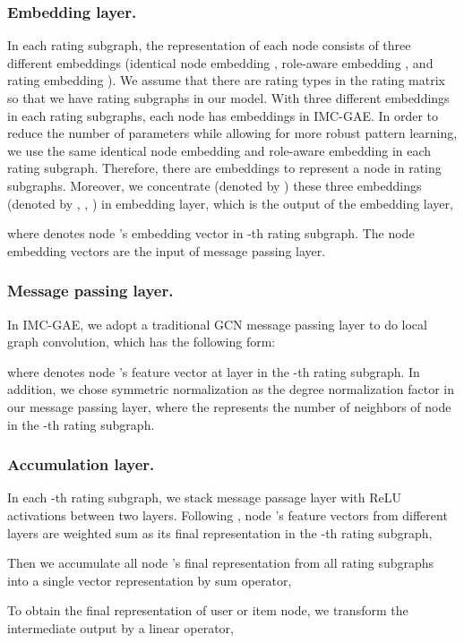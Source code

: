 \documentclass[sigconf]{acmart}
\begin{document}
\subsubsection{Embedding layer.} 
In each rating subgraph, the representation of each node consists of three different embeddings (identical node embedding , role-aware embedding , and rating embedding ). We assume that there are  rating types in the rating matrix so that we have  rating subgraphs in our model. With three different embeddings in each rating subgraphs, each node has  embeddings in IMC-GAE. 
In order to reduce the number of parameters while allowing for more robust pattern learning, we use the same identical node embedding and role-aware embedding in each rating subgraph. 
Therefore, there are  embeddings to represent a node in  rating subgraphs. Moreover, we concentrate (denoted by ) these three embeddings (denoted by , , ) in embedding layer, which is the output of the embedding layer,

where  denotes node ’s embedding vector in -th rating subgraph. The node embedding vectors are the input of message passing layer.

\subsubsection{Message passing layer.} In IMC-GAE, we adopt a traditional GCN message passing layer to do local graph convolution, which has the following form:

where  denotes node ’s feature vector at layer  in the -th rating subgraph. 
In addition, we chose symmetric normalization as the degree normalization factor in our message passing layer, where the  represents the number of neighbors of node  in the -th rating subgraph. 

\subsubsection{Accumulation layer.} 
In each -th rating subgraph, we stack  message passage layer with ReLU activations \cite{agarap2018deep} between two layers. Following \cite{he2020lightgcn}, node 's feature vectors from different layers are weighted sum as its final representation  in the -th rating subgraph,

Then we accumulate all node 's final representation  from all  rating subgraphs into a single vector representation by sum operator,

To obtain the final representation of user or item node, we transform the intermediate output  by a linear operator,
\end{document}
